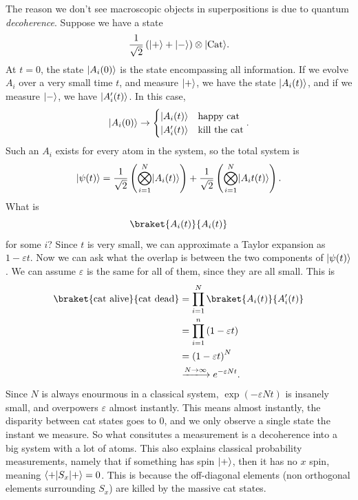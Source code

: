 The reason we don't see macroscopic objects in superpositions is due to quantum \emph{decoherence}. Suppose we have a state
\[
	\frac{1}{\sqrt{2} } \left( \lvert+\rangle + \lvert-\rangle \right) \otimes \lvert\text{Cat} \rangle 
.\]
At $t=0$, the state $\lvert A_i(0)\rangle $ is the state encompassing all information. If we evolve $A_i$ over a very small time $t$, and measure $\lvert+\rangle $, we have the state $\lvert A_i(t)\rangle $, and if we measure $\lvert-\rangle $, we have $\lvert A_i'(t)\rangle $. In this case,
\[
	\lvert A_i(0)\rangle \to
	\begin{cases}
		\lvert A_i(t)\rangle &\text{happy cat} \\
		\lvert A_i'(t)\rangle &\text{kill the cat} 
	\end{cases}
.\]
Such an $A_i$ exists for every atom in the system, so the total system is
\[
	\lvert\psi (t)\rangle =\frac{1}{\sqrt{2} } \left( \bigotimes_{i=1}^N \lvert A_i(t)\rangle  \right) +\frac{1}{\sqrt{2} } \left(\bigotimes_{i=1}^N \lvert A_it(t)\rangle \right)
.\]
What is
\[
	\braket{A_i(t)}{A_i(t)} 
\]
for some $i$? Since $t$ is very small, we can approximate a Taylor expansion as $1-\varepsilon t$. Now we can ask what the overlap is between the two components of $\lvert\psi (t)\rangle $. We can assume $\varepsilon $ is the same for all of them, since they are all small. This is
\begin{align*}
	\braket{\text{cat alive} }{\text{cat dead} } &=\prod_{i=1}^N \braket{A_i(t)}{A_i'(t)} \\
						     &=\prod_{i=1}^{n} \left( 1-\varepsilon t \right) \\
						     &=\left( 1-\varepsilon t \right)^N\\
						     &\xlongrightarrow{N\to \infty }e^{-\varepsilon Nt} 
.\end{align*}
Since $N$ is always enourmous in a classical system, $\exp (-\varepsilon Nt)$ is insanely small, and overpowers $\varepsilon $ almost instantly. This means almost instantly, the disparity between cat states goes to 0, and we only observe a single state the instant we measure. So what consitutes a measurement is a decoherence into a big system with a lot of atoms. This also explains classical probability measurements, namely that if something has spin $\lvert+\rangle $, then it has no $x$ spin, meaning $\langle+\rvert S_x \lvert+\rangle =0$. This is because the off-diagonal elements (non orthogonal elements surrounding $S_x$) are killed by the massive cat states.
